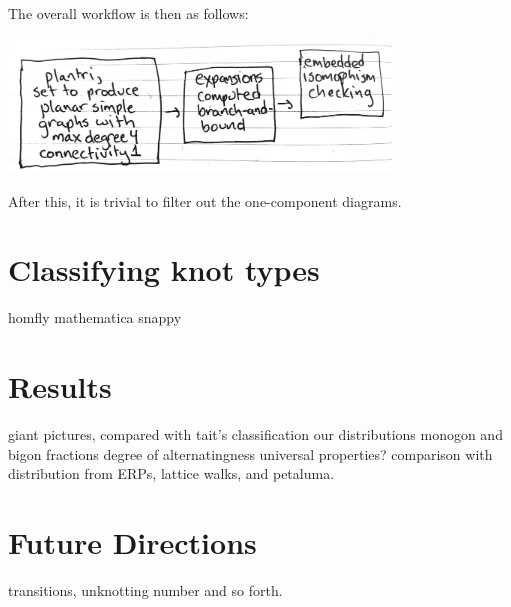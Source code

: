 \documentclass[amsmath,secnumarabic,floatfix,amssymb,nofootinbib,nobibnotes,letterpaper,11pt,tightenlines,showkeys]{revtex4}
\theoremstyle{definition}
\begin{document}
The overall workflow is then as follows:
\begin{center}
\includegraphics[width=4in]{workflow}
\end{center}
After this, it is trivial to filter out the one-component diagrams.

\section{Classifying knot types}

homfly
mathematica
snappy

\section{Results}

giant pictures, compared with tait's classification
our distributions
monogon and bigon fractions
degree of alternatingness
universal properties? comparison with distribution from ERPs, lattice walks, and petaluma.

\section{Future Directions}

transitions, unknotting number and so forth.


\end{document}
